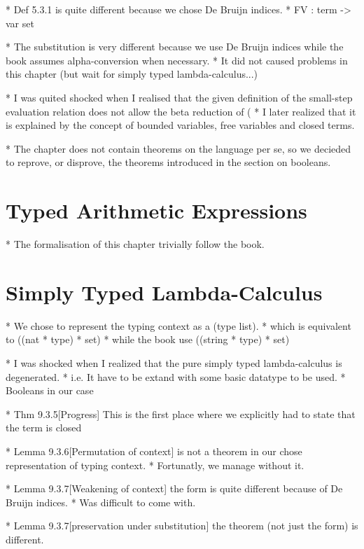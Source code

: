 \documentclass[a4paper, oneside, 12pt, titlepage]{article}
\begin{document}
  * Def 5.3.1 is quite different because we chose De Bruijn indices.
    * FV : term -> var set

  * The substitution is very different because we use De Bruijn indices while the book assumes
    alpha-conversion when necessary.
    * It did not caused problems in this chapter (but wait for simply typed lambda-calculus...)

  * I was quited shocked when I realised that the given definition of the small-step evaluation
    relation does not allow the beta reduction of (%
    * I later realized that it is explained by the concept of bounded variables, free variables and
      closed terms.

  * The chapter does not contain theorems on the language per se, so we decieded to reprove, or
    disprove, the theorems introduced in the section on booleans.

\section{Typed Arithmetic Expressions}
\label{sec:typed-arith-expr}

  * The formalisation of this chapter trivially follow the book.

\section{Simply Typed Lambda-Calculus}
\label{sec:simply-typed-lambda-calculus}

  * We chose to represent the typing context as a (type list).
    * which is equivalent to ((nat * type) * set)
    * while the book use ((string * type) * set)

  * I was shocked when I realized that the pure simply typed lambda-calculus is degenerated.
    * i.e. It have to be extand with some basic datatype to be used.
    * Booleans in our case

  * Thm 9.3.5[Progress] This is the first place where we explicitly had to state that the term is
    closed

  * Lemma 9.3.6[Permutation of context] is not a theorem in our chose representation of typing
    context.
    * Fortunatly, we manage without it.

  * Lemma 9.3.7[Weakening of context] the form is quite different because of De Bruijn indices.
    * Was difficult to come with.

  * Lemma 9.3.7[preservation under substitution] the theorem (not just the form) is different.
\end{document}
